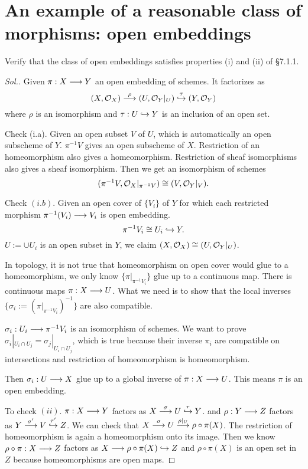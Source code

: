 \documentclass[11pt]{book} %
\begin{document}
\section{An example of a reasonable class of morphisms: open embeddings}
\begin{exr}
Verify that the class of open embeddings satisfies properties (i) and (ii) of \S 7.1.1.
\end{exr}
\begin{proof}[Sol.]
Given $\pi:X\longrightarrow Y $ an open embedding of schemes. It factorizes as
$$
(X,{\cal O}_X)\overset{\rho}{\longrightarrow}(U,{\cal O}_Y|_U)\overset{\tau}{\hookrightarrow}(Y,{\cal O}_Y)
$$
where $\rho$ is an isomorphism and $\tau:U\hookrightarrow Y$ is an inclusion of an open set.

Check (i.a). Given an open subset $V$ of $U$, which is automatically an open subscheme of $Y$. $\pi^{-1}V$ gives an open subscheme of $X$. Restriction of an homeomorphism also gives a homeomorphism. Restriction of sheaf isomorphisms also gives a sheaf isomorphism. Then we get an isomorphism of schemes
$$
(\pi^{-1}V,{\cal O}_{X}|_{\pi^{-1}V})\cong (V,{\cal O}_Y|_V).
$$

Check $(i.b)$. Given an open cover of $\{V_i\}$ of $Y$ for which each restricted morphism $\pi^{-1}(V_i)\longrightarrow V_i$ is open embedding.
$$
\pi^{-1}V_i\cong U_i\hookrightarrow Y.
$$
$U:=\cup U_i$ is an open subset in $Y$,  we claim $(X,{\cal O}_X)\cong(U,{\cal O}_Y|_U)$.

In topology, it is not true that homeomorphism on open cover would glue to a homeomorphism, we only know $\{\pi|_{\pi^{-1}V_i}\}$ glue up to a continuous map. There is continuous maps $\pi:X\longrightarrow U$. What we need is to show that the local inverses  $\{\sigma_i:=(\pi|_{\pi^{-1}V_i})^{-1}\}$ are also compatible.

$\sigma_i:U_i\longrightarrow \pi^{-1}V_i$ is an isomorphism of schemes. We want to prove $\sigma_{i}|_{U_i\cap U_j}=\sigma_{j}|_{U_i\cap U_j}$, which is true because their inverse $\pi_i$ are compatible on intersections and restriction of homeomorphism is homeomorphism.

Then $\sigma_i:U\longrightarrow X$ glue up to a global inverse of $\pi:X\longrightarrow U$. This means $\pi$ is an open embedding.

To check $(ii)$.
$\pi:X\longrightarrow Y$ factors as $X\overset{\sigma}{\longrightarrow} U\overset{\tau}{\hookrightarrow} Y$. and $\rho:Y\longrightarrow Z$ factors as $Y\overset{\sigma'}{\longrightarrow}V\overset{\tau'}{\hookrightarrow}Z$. We can check that $X\overset{\sigma}{\longrightarrow} U\overset{\rho|_U}{\longrightarrow}\rho\circ \pi(X)$. The restriction of homeomorphism is again a homeomorphism onto its image. Then we know $\rho\circ \pi:X\longrightarrow Z$ factors as $X\longrightarrow \rho\circ \pi(X)\hookrightarrow Z$ and $\rho\circ \pi(X)$ is an open set in $Z$ because homeomorphisms are open maps.
\end{proof}
\end{document}
